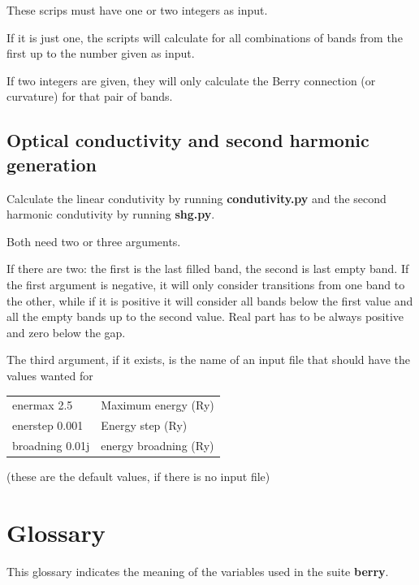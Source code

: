 \documentclass[a4paper,12pt]{report}
\begin{document}
These scrips must have one or two integers as input.

If it is just one, the scripts will calculate for all combinations of bands from the first up to the
number given as input.

If two integers are given, they will only calculate the Berry connection (or curvature) for that pair of bands.


\section{Optical conductivity and second harmonic generation}
Calculate the linear condutivity by running \textbf{condutivity.py}
and the second harmonic condutivity by running \textbf{shg.py}.

Both need two or three arguments.

 If there are two:  the first is the last filled band, the second is last empty band.
 If the first argument is negative, it will only consider transitions from one band to the other, while if it is positive it will consider all bands below the first value and all the empty bands up to the second value.
 Real part has to be always positive and zero below the gap.

 The third argument, if it exists, is the name of an input file that should have the values wanted for\medskip

\begin{tabularx}{\textwidth}{Xl}
 enermax  2.5            & Maximum energy (Ry)\\
 enerstep  0.001         & Energy step (Ry)\\
 broadning  0.01j        & energy broadning (Ry) \\
\end{tabularx}
\medskip

(these are the default values, if there is no input file)







\chapter{Glossary}

This glossary indicates the meaning of the variables used in the suite \textbf{berry}.
\vspace{0.5cm}
\end{document}

